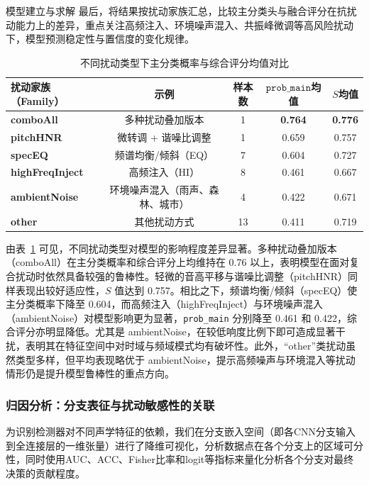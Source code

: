 \documentclass[aspectratio=169]{beamer}
\begin{document}
\begin{frame}{模型建立与求解}
最后，将结果按扰动家族汇总，比较主分类头与融合评分在抗扰动能力上的差异，重点关注高频注入、环境噪声混入、共振峰微调等高风险扰动下，模型预测稳定性与置信度的变化规律。

\begin{table}[H]
\centering
\caption{不同扰动类型下主分类概率与综合评分均值对比}
\label{tab:family-stats}
\begin{tabular}{lcccc}
\toprule
扰动家族（Family） & 示例 & 样本数 & $\texttt{prob\_main}$均值 & $S$均值 \\
\midrule
\textbf{comboAll}       & 多种扰动叠加版本                 & 1  & \textbf{0.764} & \textbf{0.776} \\
\textbf{pitchHNR}       & 微转调 + 谐噪比调整              & 1  & 0.659          & 0.757 \\
\textbf{specEQ}         & 频谱均衡/倾斜（EQ）              & 7  & 0.604          & 0.727 \\
\textbf{highFreqInject} & 高频注入（HI）                   & 8  & 0.461          & 0.667 \\
\textbf{ambientNoise}   & 环境噪声混入（雨声、森林、城市） & 4  & 0.422          & 0.671 \\
\textbf{other}          & 其他扰动方式                     & 13 & 0.411          & 0.719 \\
\bottomrule
\end{tabular}
\end{table}

由表~\ref{tab:family-stats} 可见，不同扰动类型对模型的影响程度差异显著。多种扰动叠加版本（comboAll）在主分类概率和综合评分上均维持在 0.76 以上，表明模型在面对复合扰动时依然具备较强的鲁棒性。轻微的音高平移与谐噪比调整（pitchHNR）同样表现出较好适应性，$S$ 值达到 0.757。相比之下，频谱均衡/倾斜（specEQ）使主分类概率下降至 0.604，而高频注入（highFreqInject）与环境噪声混入（ambientNoise）对模型影响更为显著，\texttt{prob\_main} 分别降至 0.461 和 0.422，综合评分亦明显降低。尤其是 ambientNoise，在较低响度比例下即可造成显著干扰，表明其在特征空间中对时域与频域模式均有破坏性。此外，“other”类扰动虽然类型多样，但平均表现略优于 ambientNoise，提示高频噪声与环境混入等扰动情形仍是提升模型鲁棒性的重点方向。






\subsubsection{归因分析：分支表征与扰动敏感性的关联}
为识别检测器对不同声学特征的依赖，我们在分支嵌入空间（即各CNN分支输入到全连接层的一维张量）进行了降维可视化，分析数据点在各个分支上的区域可分性，同时使用AUC、ACC、Fisher比率和logit等指标来量化分析各个分支对最终决策的贡献程度。


\end{frame}
\end{document}

